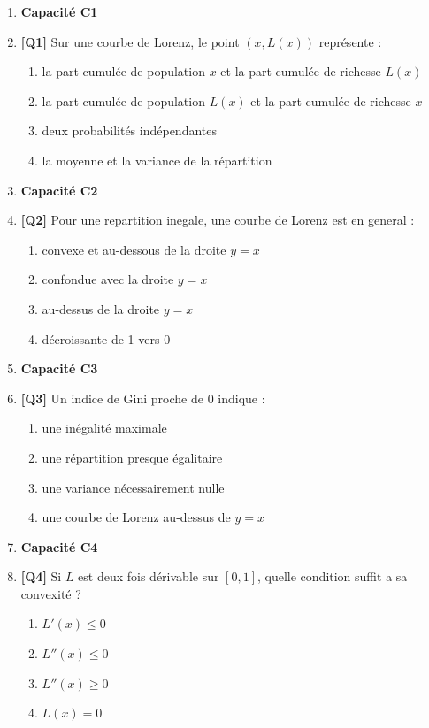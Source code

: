 \begin{enumerate}

\item[] \textbf{Capacité C1}

\item \textbf{[Q1]} Sur une courbe de Lorenz, le point $(x,L(x))$ représente :
  \begin{enumerate}[label=\Alph*.]
    \item la part cumulée de population $x$ et la part cumulée de richesse $L(x)$
    \item la part cumulée de population $L(x)$ et la part cumulée de richesse $x$
    \item deux probabilités indépendantes
    \item la moyenne et la variance de la répartition
  \end{enumerate}

\item[] \textbf{Capacité C2}

\item \textbf{[Q2]} Pour une repartition inegale, une courbe de Lorenz est en general :
  \begin{enumerate}[label=\Alph*.]
    \item convexe et au-dessous de la droite $y=x$
    \item confondue avec la droite $y=x$
    \item au-dessus de la droite $y=x$
    \item décroissante de 1 vers 0
  \end{enumerate}

\item[] \textbf{Capacité C3}

\item \textbf{[Q3]} Un indice de Gini proche de $0$ indique :
  \begin{enumerate}[label=\Alph*.]
    \item une inégalité maximale
    \item une répartition presque égalitaire
    \item une variance nécessairement nulle
    \item une courbe de Lorenz au-dessus de $y=x$
  \end{enumerate}

\item[] \textbf{Capacité C4}

\item \textbf{[Q4]} Si $L$ est deux fois dérivable sur $[0,1]$, quelle condition suffit a sa convexité ?
  \begin{enumerate}[label=\Alph*.]
    \item $L'(x)\leq0$
    \item $L''(x)\leq0$
    \item $L''(x)\geq0$
    \item $L(x)=0$
  \end{enumerate}


\end{enumerate}
